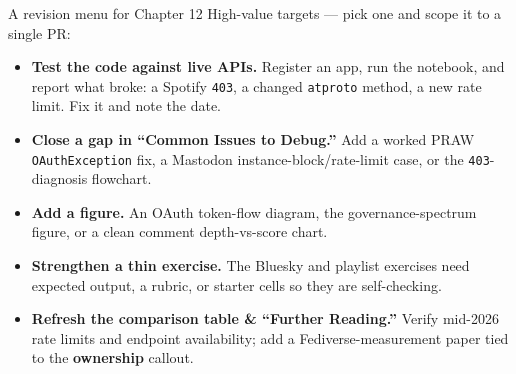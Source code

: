 \documentclass[9pt,aspectratio=169]{beamer}
\begin{document}
\begin{frame}{A revision menu for Chapter 12}
    High-value targets --- pick one and scope it to a single PR:
    \begin{itemize}
        \item \textbf{Test the code against live APIs.} Register an app, run the notebook, and report what broke: a Spotify \texttt{403}, a changed \texttt{atproto} method, a new rate limit. Fix it and note the date.
        \item \textbf{Close a gap in ``Common Issues to Debug.''} Add a worked PRAW \texttt{OAuthException} fix, a Mastodon instance-block/rate-limit case, or the \texttt{403}-diagnosis flowchart.
        \item \textbf{Add a figure.} An OAuth token-flow diagram, the governance-spectrum figure, or a clean comment depth-vs-score chart.
        \item \textbf{Strengthen a thin exercise.} The Bluesky and playlist exercises need expected output, a rubric, or starter cells so they are self-checking.
        \item \textbf{Refresh the comparison table \& ``Further Reading.''} Verify mid-2026 rate limits and endpoint availability; add a Fediverse-measurement paper tied to the \textbf{ownership} callout.
    \end{itemize}
\end{frame}
\end{document}
